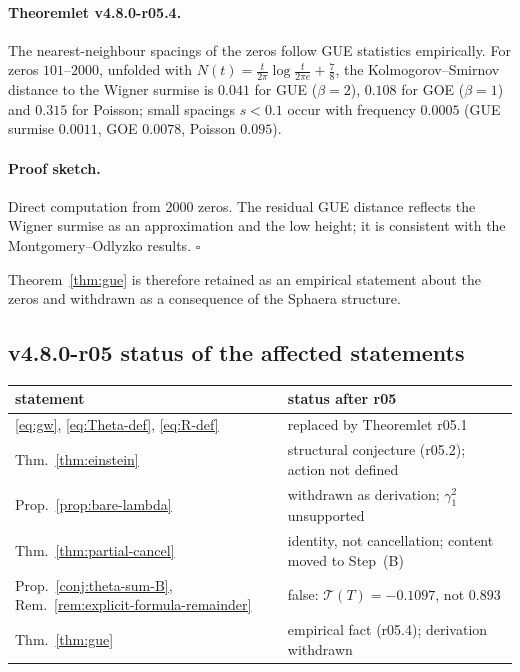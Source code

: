 \paragraph{Theoremlet v4.8.0-r05.4.}
The nearest-neighbour spacings of the zeros follow GUE statistics empirically.  For zeros
\(101\)--\(2000\), unfolded with \(N(t)=\tfrac{t}{2\pi}\log\tfrac{t}{2\pi e}+\tfrac78\), the
Kolmogorov--Smirnov distance to the Wigner surmise is \(0.041\) for GUE (\(\beta=2\)), \(0.108\)
for GOE (\(\beta=1\)) and \(0.315\) for Poisson; small spacings \(s<0.1\) occur with frequency
\(0.0005\) (GUE surmise \(0.0011\), GOE \(0.0078\), Poisson \(0.095\)).

\paragraph{Proof sketch.}
Direct computation from 2000 zeros.  The residual GUE distance reflects the Wigner surmise as an
approximation and the low height; it is consistent with the Montgomery--Odlyzko results.
\(\square\)

Theorem~\ref{thm:gue} is therefore retained as an empirical statement about the zeros and
withdrawn as a consequence of the Sphaera structure.

\subsection*{v4.8.0-r05 status of the affected statements}
\label{subsec:v480-r05-status}

\begin{center}
\small
\begin{tabular}{@{}>{\raggedright\arraybackslash}p{}>{\raggedright\arraybackslash}p{}@{}}
\toprule
statement & status after r05\\
\midrule
\eqref{eq:gw}, \eqref{eq:Theta-def}, \eqref{eq:R-def} & replaced by Theoremlet r05.1\\
Thm.~\ref{thm:einstein} & structural conjecture (r05.2); action not defined\\
Prop.~\ref{prop:bare-lambda} & withdrawn as derivation; \(\gamma_1^2\) unsupported\\
Thm.~\ref{thm:partial-cancel} & identity, not cancellation; content moved to Step~(B)\\
Prop.~\ref{conj:theta-sum-B}, Rem.~\ref{rem:explicit-formula-remainder} & false: \(\mathcal T(T)=-0.1097\), not \(0.893\)\\
Thm.~\ref{thm:gue} & empirical fact (r05.4); derivation withdrawn\\
\bottomrule
\end{tabular}
\end{center}

